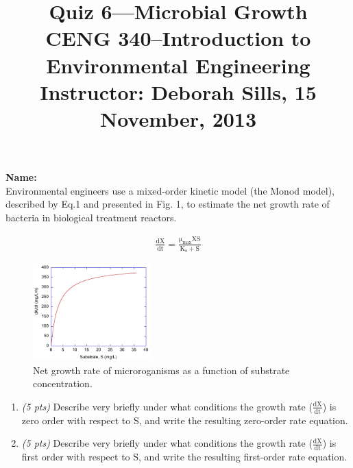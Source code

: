 \documentclass[12pt,letterpaper]{article}
\begin{document}
\setlength{\parindent}{0cm} 


\frenchspacing


\title {\large{\textbf{Quiz 6---Microbial Growth}}\\ \large{CENG 340--Introduction to Environmental Engineering\\
Instructor: Deborah Sills, \textbf{15 November, 2013}}}
\author {}
\date {}
\maketitle

\vspace{-0.5 in}
\textbf{\large{Name:}}\\


Environmental engineers use a mixed-order kinetic model (the Monod model), described by Eq.1 and presented in Fig. 1, to estimate the net growth rate of bacteria in biological treatment reactors.  

\begin{align}
\mathrm{\frac{dX}{dt} = \frac{\mu_{max}XS}{K_s + S}}
\end{align}

\begin{figure}
\centering
\includegraphics[width=0.4\textwidth]{monod}
\caption{Net growth rate of microroganisms as a function of substrate concentration.}
\end{figure}

\begin{enumerate}
\item \emph{(5 pts)} Describe very briefly under what conditions the growth rate ($\mathrm{\frac{dX}{dt}}$) is zero order with respect to S, and write the resulting zero-order rate equation.

\vspace{1.3in}

\item \emph{(5 pts)} Describe very briefly under what conditions the growth rate ($\mathrm{\frac{dX}{dt}}$) is first order with respect to S, and write the resulting first-order rate equation.



%
%
\end{enumerate}


\vspace{-0.1in}
\end{document}
